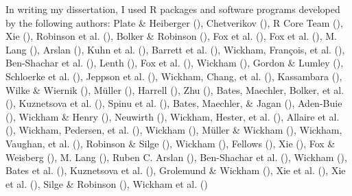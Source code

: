 \documentclass[
]{udthesis}
\begin{document}
In writing my dissertation, I used R packages and software programs developed by the following authors: Plate \& Heiberger (), Chetverikov (), R Core Team (), Xie (), Robinson et al. (), Bolker \& Robinson (), Fox et al. (), Fox et al. (), M. Lang (), Arslan (), Kuhn et al. (), Barrett et al. (), Wickham, François, et al. (), Ben-Shachar et al. (), Lenth (), Fox et al. (), Wickham (), Gordon \& Lumley (), Schloerke et al. (), Jeppson et al. (), Wickham, Chang, et al. (), Kassambara (), Wilke \& Wiernik (), Müller (), Harrell (), Zhu (), Bates, Maechler, Bolker, et al. (), Kuznetsova et al. (), Spinu et al. (), Bates, Maechler, \& Jagan (), Aden-Buie (), Wickham \& Henry (), Neuwirth (), Wickham, Hester, et al. (), Allaire et al. (), Wickham, Pedersen, et al. (), Wickham (), Müller \& Wickham (), Wickham, Vaughan, et al. (), Robinson \& Silge (), Wickham (), Fellows (), Xie (), Fox \& Weisberg (), M. Lang (), Ruben C. Arslan (), Ben-Shachar et al. (), Wickham (), Bates et al. (), Kuznetsova et al. (), Grolemund \& Wickham (), Xie et al. (), Xie et al. (), Silge \& Robinson (), Wickham et al. ()
\end{document}
